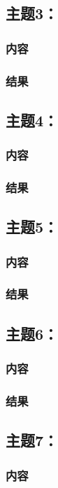 \documentclass{article}
\begin{document}
\subsection{主题3：}  
\subsubsection{内容}
\subsubsection{结果}  
\vspace{1cm}
\subsection{主题4：}  
\subsubsection{内容}
\subsubsection{结果}  
\vspace{1cm}
\subsection{主题5：}  
\subsubsection{内容}
\subsubsection{结果}  
\vspace{1cm}
\subsection{主题6：}  
\subsubsection{内容}
\subsubsection{结果}  
\vspace{1cm}
\subsection{主题7：}  
\subsubsection{内容}
\end{document}
